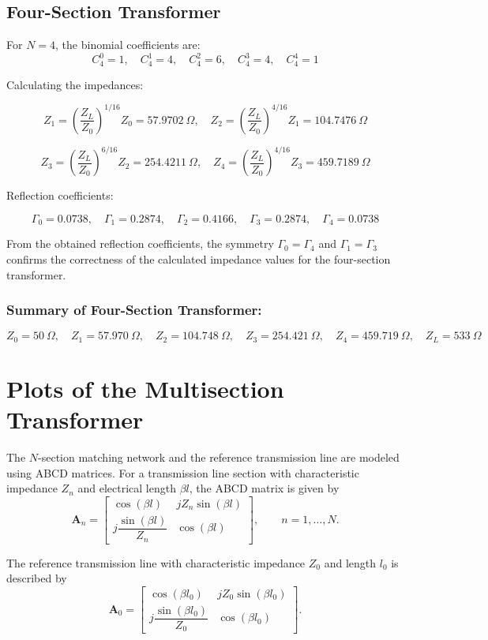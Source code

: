 \documentclass[a4paper,11pt]{article}
\begin{document}
\subsection*{Four-Section Transformer}

For $N = 4$, the binomial coefficients are:
\[
C_4^0 = 1, \quad C_4^1 = 4, \quad C_4^2 = 6, \quad C_4^3 = 4, \quad C_4^4 = 1
\]

Calculating the impedances:

\[
Z_1 = \left(\frac{Z_L}{Z_0}\right)^{1/16} Z_0 = 57.9702~\Omega, \quad
Z_2 = \left(\frac{Z_L}{Z_0}\right)^{4/16} Z_1 = 104.7476~\Omega
\]

\[
Z_3 = \left(\frac{Z_L}{Z_0}\right)^{6/16} Z_2 = 254.4211~\Omega, \quad
Z_4 = \left(\frac{Z_L}{Z_0}\right)^{4/16} Z_3 = 459.7189~\Omega
\]

Reflection coefficients:

\[
\Gamma_0 = 0.0738, \quad
\Gamma_1 = 0.2874, \quad
\Gamma_2 = 0.4166, \quad
\Gamma_3 = 0.2874, \quad
\Gamma_4 = 0.0738
\]

From the obtained reflection coefficients, the symmetry
$\Gamma_0 = \Gamma_4$ and $\Gamma_1 = \Gamma_3$
confirms the correctness of the calculated impedance values for the
four-section transformer.

\subsubsection*{Summary of Four-Section Transformer:}
\[
Z_0 = 50~\Omega, \quad Z_1 = 57.970~\Omega, \quad Z_2 = 104.748~\Omega, \quad Z_3 = 254.421~\Omega, \quad Z_4 = 459.719~\Omega, \quad Z_L = 533~\Omega
\]


\section{Plots of the Multisection Transformer}

The $N$-section matching network and the reference transmission line
are modeled using ABCD matrices.
For a transmission line section with characteristic impedance $Z_n$
and electrical length $\beta l$, the ABCD matrix is given by
\[
\mathbf{A}_n =
\begin{bmatrix}
\cos(\beta l) & j Z_n \sin(\beta l) \\
j \dfrac{\sin(\beta l)}{Z_n} & \cos(\beta l)
\end{bmatrix},
\qquad n = 1,\dots,N.
\]

The reference transmission line with characteristic impedance $Z_0$
and length $l_0$ is described by
\[
\mathbf{A}_0 =
\begin{bmatrix}
\cos(\beta l_0) & j Z_0 \sin(\beta l_0) \\
j \dfrac{\sin(\beta l_0)}{Z_0} & \cos(\beta l_0)
\end{bmatrix}.
\]
\end{document}
